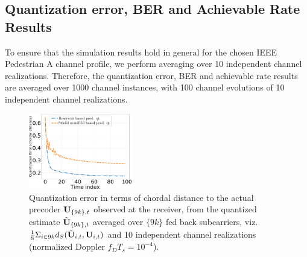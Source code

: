 \documentclass[conference]{IEEEtran}
\begin{document}
{\subsection{Quantization error, BER and Achievable Rate Results}
\label{res}{}
\noindent To ensure that the simulation results hold in general for the chosen IEEE Pedestrian A channel profile, we perform averaging over 10 independent channel realizations. Therefore, the quantization error, BER and achievable rate results are averaged over 1000 channel instances, with 100 channel evolutions of 10 independent channel realizations.
\begin{figure}
\centering
\includegraphics[width=0.4\textwidth]{images/qtizErr.pdf}
\caption{Quantization error in terms of chordal distance to the actual precoder ${\bf U}_{\{9k\},t}$ observed at the receiver, from the quantized estimate $\tilde{{\bf U}}_{\{9k\},t}$ averaged over $\{9k\}$ fed back subcarriers, viz. $\frac{1}{8}\Sigma_{i \in 9k}d_S(\tilde{{\bf U}}_{i,t}, {\bf U}_{i,t})$ and 10 independent channel realizations (normalized Doppler $f_DT_s=10^{-4}$).}
\label{qtiz_err}
\end{figure}

}
\end{document}
